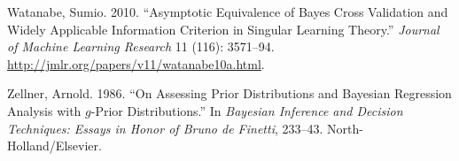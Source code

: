 \documentclass[
  11pt,
  letterpaper,
]{scrbook}
\newlength{\cslhangindent}
\newenvironment{CSLReferences}[2] %
 {\begin{list}{}{%
  \setlength{\itemindent}{0pt}
  \setlength{\leftmargin}{0pt}
  \setlength{\parsep}{0pt}
  \ifodd #1
   \setlength{\leftmargin}{\cslhangindent}
   \setlength{\itemindent}{-1\cslhangindent}
  \fi
  \setlength{\itemsep}{#2\baselineskip}}}
 {\end{list}}
\theoremstyle{definition}
\theoremstyle{plain}
\theoremstyle{plain}
\theoremstyle{definition}
\theoremstyle{definition}
\theoremstyle{remark}
\begin{document}
\begin{CSLReferences}{1}{0}
Watanabe, Sumio. 2010. {``Asymptotic Equivalence of {B}ayes Cross
Validation and Widely Applicable Information Criterion in Singular
Learning Theory.''} \emph{Journal of Machine Learning Research} 11
(116): 3571--94. \url{http://jmlr.org/papers/v11/watanabe10a.html}.

Zellner, Arnold. 1986. {``On Assessing Prior Distributions and
{B}ayesian Regression Analysis with \(g\)-Prior Distributions.''} In
\emph{{B}ayesian Inference and Decision Techniques: Essays in Honor of
{B}runo de {F}inetti}, 233--43. North-Holland/Elsevier.

\end{CSLReferences}


\backmatter
\end{document}
